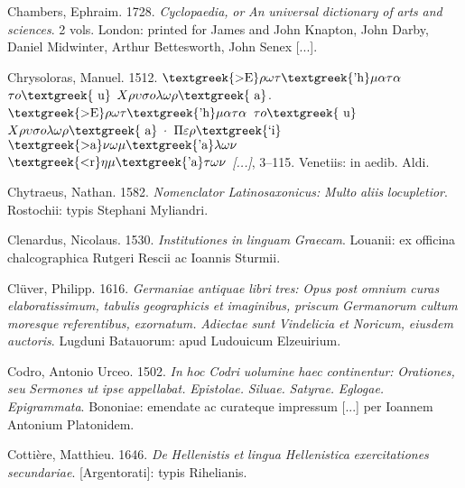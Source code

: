 \documentclass[output=paper]{langsci/langscibook}
\begin{document}
Chambers, Ephraim. 1728. \textit{Cyclopaedia,} \textit{or} \textit{An} \textit{universal} \textit{dictionary} \textit{of} \textit{arts} \textit{and} \textit{sciences}. 2 vols. London: printed for James and John Knapton, John Darby, Daniel Midwinter, Arthur Bettesworth, John Senex [...].

Chrysoloras, Manuel. 1512. $\text{\textgreek{>E}}\rho \omega \tau \text{\textgreek{'h}}\mu \alpha \tau \alpha $ $\tau o\text{\textgreek{~u}}$ $X\rho \upsilon \sigma o\lambda \omega \rho \text{\textgreek{~a}}$. \textit{$\text{\textgreek{>E}}\rho \omega \tau \text{\textgreek{'h}}\mu \alpha \tau \alpha $ $\tau o\text{\textgreek{~u}}$ $X\rho \upsilon \sigma o\lambda \omega \rho \text{\textgreek{~a}}$· $\Pi \varepsilon \rho \text{\textgreek{`i}}$ $\text{\textgreek{>a}}\nu \omega \mu \text{\textgreek{'a}}\lambda \omega \nu $ $\text{\textgreek{<r}}\eta \mu \text{\textgreek{'a}}\tau \omega \nu $ [...]}, 3–115. Venetiis: in aedib. Aldi.

Chytraeus, Nathan. 1582. \textit{Nomenclator} \textit{Latinosaxonicus:} \textit{Multo} \textit{aliis} \textit{locupletior}. Rostochii: typis Stephani Myliandri.

Clenardus, Nicolaus. 1530. \textit{Institutiones} \textit{in} \textit{linguam} \textit{Graecam}. Louanii: ex officina chalcographica Rutgeri Rescii ac Ioannis Sturmii.

Clüver, Philipp. 1616. \textit{Germaniae} \textit{antiquae} \textit{libri} \textit{tres:} \textit{Opus} \textit{post} \textit{omnium} \textit{curas} \textit{elaboratissimum,} \textit{tabulis} \textit{geographicis} \textit{et} \textit{imaginibus,} \textit{priscum} \textit{Germanorum} \textit{cultum} \textit{moresque} \textit{referentibus,} \textit{exornatum.} \textit{Adiectae} \textit{sunt} \textit{Vindelicia} \textit{et} \textit{Noricum,} \textit{eiusdem} \textit{auctoris}. Lugduni Batauorum: apud Ludouicum Elzeuirium.

Codro, Antonio Urceo. 1502. \textit{In} \textit{hoc} \textit{Codri} \textit{uolumine} \textit{haec} \textit{continentur:} \textit{Orationes,} \textit{seu} \textit{Sermones} \textit{ut} \textit{ipse} \textit{appellabat.} \textit{Epistolae.} \textit{Siluae.} \textit{Satyrae.} \textit{Eglogae.} \textit{Epigrammata}. Bononiae: emendate ac curateque impressum [...] per Ioannem Antonium Platonidem.

Cottière, Matthieu. 1646. \textit{De} \textit{Hellenistis} \textit{et} \textit{lingua} \textit{Hellenistica} \textit{exercitationes} \textit{secundariae}. [Argentorati]: typis Rihelianis.
\end{document}
